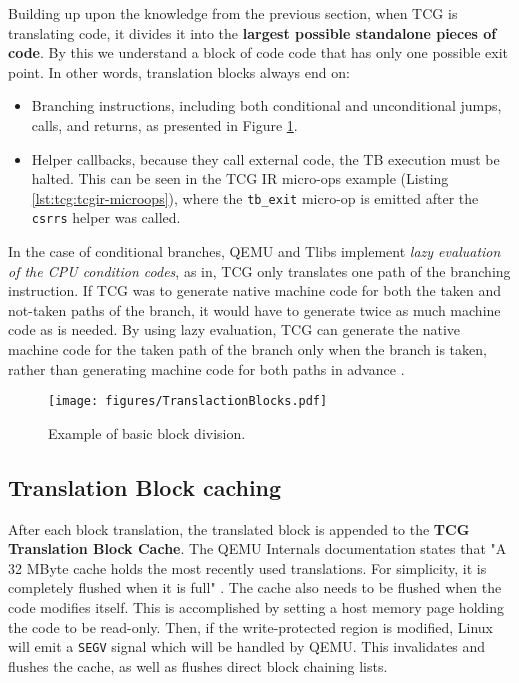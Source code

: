 Building up upon the knowledge from the previous section, when TCG is translating code, it divides it into the \textbf{largest possible standalone pieces of code}. By this we understand a block of code code that has only one
possible exit point. In other words, translation blocks always end on:
\begin{itemize}
    \item{Branching instructions, including both conditional and unconditional jumps, calls, and returns, as presented in Figure \ref{fig:block-division}.}
    \item{Helper callbacks, because they call external code, the TB execution must be halted. This can be seen
    in the TCG IR micro-ops example (Listing \ref{lst:tcg:tcgir-microops}), where the \texttt{tb\_exit} micro-op is emitted
    after the \texttt{csrrs} helper was called.}
\end{itemize}

In the case of conditional branches, QEMU and Tlibs implement \textit{lazy evaluation of the CPU condition codes},
as in, TCG only translates one path of the branching instruction. If TCG was to generate native machine code
for both the taken and not-taken paths of the branch, it would have to generate twice as much machine code as is needed.
By using lazy evaluation, TCG can generate the native machine code for the taken path of the branch only when the
branch is taken, rather than generating machine code for both paths in advance \cite{QemuInternalsTech}.

\pagebreak
\begin{figure}[h]
	\centering
	\texttt{[image: figures/TranslactionBlocks.pdf]}
	\caption{Example of basic block division.}
    \label{fig:block-division}
\end{figure}

\subsection{Translation Block caching}

After each block translation, the translated block is appended to the \textbf{TCG Translation Block Cache}.
The QEMU Internals documentation states that "A 32 MByte cache holds the most recently used translations. For simplicity, it is
completely flushed when it is full" \cite{QemuInternalsTech}. The cache also needs to be flushed when the code modifies
itself. This is accomplished by setting a host memory page holding the code to be read-only. Then, if the
write-protected region is modified, Linux will emit a \texttt{SEGV} signal which will be handled by QEMU. This
invalidates and flushes the cache, as well as flushes direct block chaining lists.

